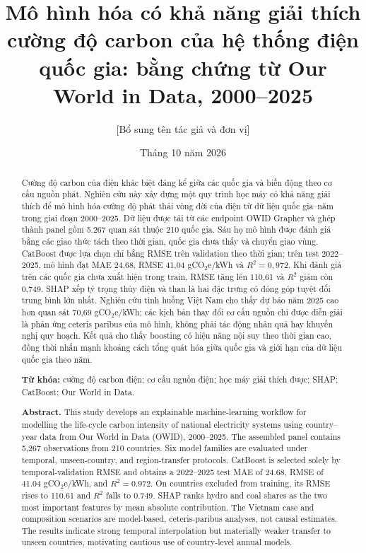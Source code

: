\documentclass[11pt,a4paper]{article}
\title{\textbf{Mô hình hóa có khả năng giải thích cường độ carbon của hệ thống điện quốc gia: bằng chứng từ Our World in Data, 2000--2025}}
\author{[Bổ sung tên tác giả và đơn vị]}
\date{Tháng 10 năm 2026}
\begin{document}
\maketitle

\begin{abstract}
Cường độ carbon của điện khác biệt đáng kể giữa các quốc gia và biến động theo
cơ cấu nguồn phát. Nghiên cứu này xây dựng một quy trình học máy có khả năng
giải thích để mô hình hóa cường độ phát thải vòng đời của điện từ dữ liệu quốc
gia--năm trong giai đoạn 2000--2025. Dữ liệu được tải từ các endpoint OWID
Grapher và ghép thành panel gồm 5.267 quan sát thuộc 210 quốc gia. Sáu họ mô
hình được đánh giá bằng các giao thức tách theo thời gian, quốc gia chưa thấy
và chuyển giao vùng. CatBoost được lựa chọn chỉ bằng RMSE trên validation theo
thời gian; trên test 2022--2025, mô hình đạt MAE 24,68, RMSE 41,04
gCO$_2$e/kWh và $R^2=0,972$. Khi đánh giá trên các quốc gia chưa xuất hiện trong
train, RMSE tăng lên 110,61 và $R^2$ giảm còn 0,749. SHAP xếp tỷ trọng thủy
điện và than là hai đặc trưng có đóng góp tuyệt đối trung bình lớn nhất.
Nghiên cứu tình huống Việt Nam cho thấy dự báo năm 2025 cao hơn quan sát 70,69
gCO$_2$e/kWh; các kịch bản thay đổi cơ cấu nguồn chỉ được diễn giải là phản ứng
ceteris paribus của mô hình, không phải tác động nhân quả hay khuyến nghị quy
hoạch. Kết quả cho thấy boosting có hiệu năng nội suy theo thời gian cao, đồng
thời nhấn mạnh khoảng cách tổng quát hóa giữa quốc gia và giới hạn của dữ liệu
quốc gia theo năm.

\medskip
\noindent\textbf{Từ khóa:} cường độ carbon điện; cơ cấu nguồn điện; học máy giải
thích được; SHAP; CatBoost; Our World in Data.
\end{abstract}

\begin{abstract}
\noindent\textbf{Abstract.}
This study develops an explainable machine-learning workflow for modelling
the life-cycle carbon intensity of national electricity systems using
country--year data from Our World in Data (OWID), 2000--2025. The assembled
panel contains 5,267 observations from 210 countries. Six model families are
evaluated under temporal, unseen-country, and region-transfer protocols.
CatBoost is selected solely by temporal-validation RMSE and obtains a
2022--2025 test MAE of 24.68, RMSE of 41.04 gCO$_2$e/kWh, and
$R^2=0.972$. On countries excluded from training, its RMSE rises to 110.61
and $R^2$ falls to 0.749. SHAP ranks hydro and coal shares as the two most
important features by mean absolute contribution. The Vietnam case and
composition scenarios are model-based, ceteris-paribus analyses, not causal
estimates. The results indicate strong temporal interpolation but materially
weaker transfer to unseen countries, motivating cautious use of country-level
annual models.
\end{abstract}
\end{document}
